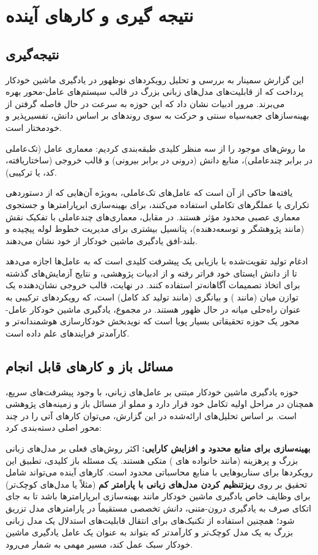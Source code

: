 \chapter{نتیجه گیری و کارهای آینده}
\thispagestyle{empty}
\section{نتیجه‌گیری}
این گزارش سمینار به بررسی و تحلیل رویکردهای نوظهور در یادگیری ماشین خودکار پرداخت که از قابلیت‌های مدل‌های زبانی بزرگ در قالب سیستم‌های عامل-محور بهره می‌برند. مرور ادبیات نشان داد که این حوزه به سرعت در حال فاصله گرفتن از بهینه‌سازهای جعبه‌سیاه سنتی و حرکت به سوی روندهای بر اساس دانش، تفسیرپذیر و خودمختار است.

ما روش‌های موجود را از سه منظر کلیدی طبقه‌بندی کردیم: معماری عامل (تک‌عاملی در برابر چندعاملی)، منابع دانش (درونی در برابر بیرونی) و قالب خروجی (ساختاریافته، کد، یا ترکیبی).

یافته‌ها حاکی از آن است که عامل‌های تک‌عاملی، به‌ویژه آن‌هایی که از دستوردهی تکراری یا عملگرهای تکاملی استفاده می‌کنند، برای بهینه‌سازی ابرپارامترها و جستجوی معماری عصبی محدود مؤثر هستند. در مقابل، معماری‌های چندعاملی با تفکیک نقش (مانند پژوهشگر و توسعه‌دهنده)، پتانسیل بیشتری برای مدیریت خطوط لوله پیچیده و بلند-افق یادگیری ماشین خودکار از خود نشان می‌دهند.

ادغام تولید تقویت‌شده با بازیابی یک پیشرفت کلیدی است که به عامل‌ها اجازه می‌دهد تا از دانش ایستای خود فراتر رفته و از ادبیات پژوهشی،  و نتایج آزمایش‌های گذشته برای اتخاذ تصمیمات آگاهانه‌تر استفاده کنند. در نهایت، قالب خروجی نشان‌دهنده یک توازن میان  (مانند ) و بیانگری (مانند تولید کد کامل) است، که رویکردهای ترکیبی به عنوان راه‌حلی میانه در حال ظهور هستند. در مجموع، یادگیری ماشین خودکار عامل-محور یک حوزه تحقیقاتی بسیار پویا است که نویدبخش خودکارسازی هوشمندانه‌تر و کارآمدتر فرایندهای علم داده است.

\section{مسائل باز و کارهای قابل انجام}
حوزه یادگیری ماشین خودکار مبتنی بر عامل‌های زبانی، با وجود پیشرفت‌های سریع، همچنان در مراحل اولیه تکامل خود قرار دارد و مملو از مسائل باز و زمینه‌های پژوهشی است. بر اساس تحلیل‌های ارائه‌شده در این گزارش، می‌توان کارهای آتی را در چند محور اصلی دسته‌بندی کرد:

\textbf{بهینه‌سازی برای منابع محدود و افزایش کارایی:} اکثر روش‌های فعلی بر مدل‌های زبانی بزرگ و پرهزینه (مانند خانواده های ) متکی هستند. یک مسئله باز کلیدی، تطبیق این رویکردها برای سناریوهایی با منابع محاسباتی محدود است. کارهای آینده می‌تواند شامل تحقیق بر روی \textbf{ریزتنظیم کردن مدل‌های زبانی با پارامتر کم} (مثلاً  یا مدل‌های کوچک‌تر) برای وظایف خاص یادگیری ماشین خودکار مانند بهینه‌سازی ابرپارامترها باشد تا به جای اتکای صرف به یادگیری درون-متنی، دانش تخصصی مستقیماً در پارامترهای مدل تزریق شود؛ همچنین استفاده از تکنیک‌های  برای انتقال قابلیت‌های استدلال یک مدل زبانی بزرگ به یک مدل کوچک‌تر و کارآمدتر که بتواند به عنوان یک عامل یادگیری ماشین خودکار سبک عمل کند، مسیر مهمی به شمار می‌رود.

